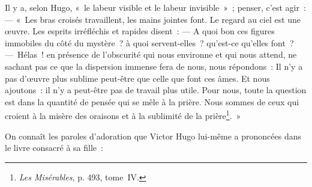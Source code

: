\documentclass[french,twoside]{book} %
\begin{document}
\noindent Il y a, selon Hugo, « le labeur visible et le labeur invisible » ; penser, c’est agir : — « Les bras croisés travaillent, les mains jointes font. Le regard au ciel est une œuvre. Les esprits irréfléchis et rapides disent : — A quoi bon ces figures immobiles du côté du mystère ? à quoi servent-elles ? qu’est-ce qu’elles font ? — Hélas ! en présence de l’obscurité qui nous environne et qui nous attend, ne sachant pas ce que la dispersion immense fera de nous, nous répondons : Il n’y a pas d’œuvre plus sublime peut-être que celle que font ces âmes. Et nous ajoutons : il n’y a peut-être pas de travail plus utile. Pour nous, toute la question est dans la quantité de pensée qui se mêle à la prière. Nous sommes de ceux qui croient à la misère des oraisons et à la sublimité de la prière\footnote{\emph{Les Misérables}, p. 493, tome IV.}. »\par
On connaît les paroles d’adoration que Victor Hugo lui-même a prononcées dans le livre consacré à sa fille :\par
\end{document}
